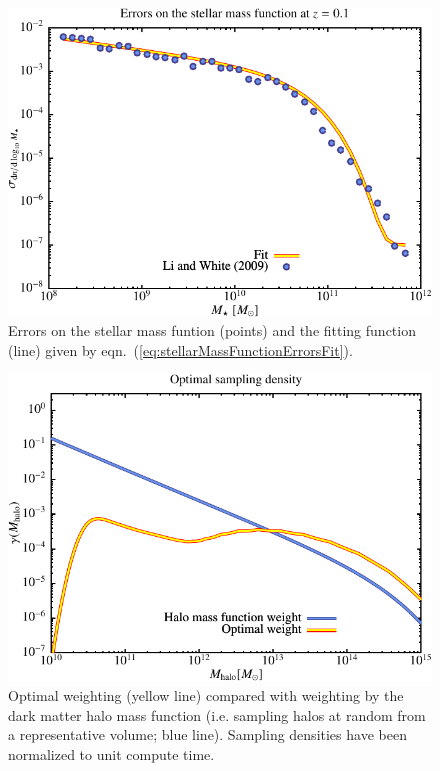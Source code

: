 \begin{figure}
 \begin{center}
 \includegraphics[width=160mm]{../plots/stellarMassFunctionErrors_z01.pdf}
 \end{center}
 \caption{Errors on the \protect\cite{li_distribution_2009} stellar mass funtion (points) and the fitting function (line) given by eqn.~(\protect\ref{eq:stellarMassFunctionErrorsFit}).}
 \label{fig:stellarMassFunctionErrors}
\end{figure}

\begin{figure}
 \begin{center}
 \includegraphics[width=160mm]{../plots/optimalSamplingStellarMassFunction.pdf}
 \end{center}
 \caption{Optimal weighting (yellow line) compared with weighting by the dark matter halo mass function (i.e. sampling halos at random from a representative volume; blue line). Sampling densities have been normalized to unit compute time.}
 \label{fig:optimalSamplingStellarMassFunction}
\end{figure}

